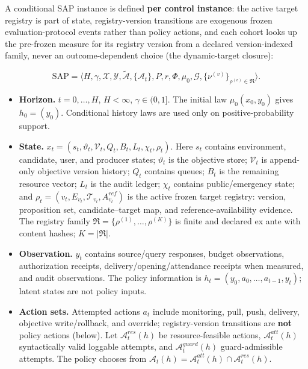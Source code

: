 \documentclass[
  11pt]{article}
\providecommand{\tightlist}{%
  \setlength{\itemsep}{0pt}\setlength{\parskip}{0pt}}
\begin{document}
A conditional SAP instance is defined \textbf{per control instance}: the
active target registry is part of state, registry-version transitions
are exogenous frozen evaluation-protocol events rather than policy
actions, and each cohort looks up the pre-frozen measure for its
registry version from a declared version-indexed family, never an
outcome-dependent choice (the dynamic-target closure):

\[\mathrm{SAP}=\langle H,\gamma,\mathcal X,\mathcal Y,\widetilde{\mathcal A},\{\mathcal A_t\},P,r,\Phi,\mu_0,\mathcal G,\{\nu^{(v)}\}_{\rho^{(v)}\in\mathfrak R}\rangle.\tag{1}\]

\begin{itemize}
\tightlist
\item
  \textbf{Horizon.} \(t=0,\ldots,H\), \(H<\infty\), \(\gamma\in(0,1]\).
  The initial law \(\mu_0(x_0,y_0)\) gives \(h_0=(y_0)\). Conditional
  history laws are used only on positive-probability support.
\item
  \textbf{State.}
  \(x_t=(s_t,\vartheta_t,\mathcal V_t,Q_t,B_t,L_t,\chi_t,\rho_t)\). Here
  \(s_t\) contains environment, candidate, user, and producer states;
  \(\vartheta_t\) is the objective store; \(\mathcal V_t\) is
  append-only objective version history; \(Q_t\) contains queues;
  \(B_t\) is the remaining resource vector; \(L_t\) is the audit ledger;
  \(\chi_t\) contains public/emergency state; and
  \(\rho_t=(v_t,E_{v_t},\mathcal T_{v_t},A^{ref}_{v_t})\) is the active
  frozen target registry: version, proposition set, candidate--target
  map, and reference-availability evidence. The registry family
  \(\mathfrak R=\{\rho^{(1)},\ldots,\rho^{(K)}\}\) is finite and
  declared ex ante with content hashes; \(K=|\mathfrak R|\).
\item
  \textbf{Observation.} \(y_t\) contains source/query responses, budget
  observations, authorization receipts, delivery/opening/attendance
  receipts when measured, and audit observations. The policy information
  is \(h_t=(y_0,a_0,\ldots,a_{t-1},y_t)\); latent states are not policy
  inputs.
\item
  \textbf{Action sets.} Attempted actions \(a_t\) include monitoring,
  pull, push, delivery, objective write/rollback, and override;
  registry-version transitions are \textbf{not} policy actions (below).
  Let \(\mathcal A^{res}_t(h)\) be resource-feasible actions,
  \(\mathcal A^{att}_t(h)\) syntactically valid loggable attempts, and
  \(\mathcal A^{guard}_t(h)\) guard-admissible attempts. The policy
  chooses from
  \(\mathcal A_t(h)=\mathcal A^{att}_t(h)\cap\mathcal A^{res}_t(h)\).

\end{itemize}
\end{document}
